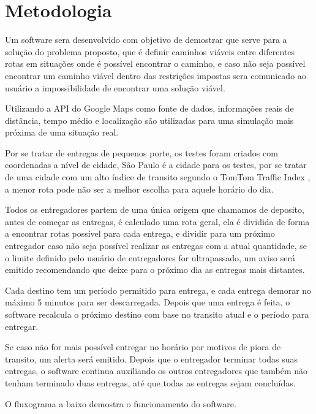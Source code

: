 \chapter{Metodologia}
Um software sera desenvolvido com objetivo de demostrar que serve para a solução do problema proposto, que é definir caminhos viáveis entre diferentes rotas em situações onde é possível encontrar o caminho, e caso não seja possível encontrar um caminho viável dentro das restrições impostas sera comunicado ao usuário a impossibilidade de encontrar uma solução viável.

Utilizando a API do Google Maps como fonte de dados, informações reais de distância, tempo médio e localização são utilizadas para uma simulação mais próxima de uma situação real.

Por se tratar de entregas de pequenos porte, os testes foram criados com coordenadas a nível de cidade, São Paulo é a cidade para os testes, por se tratar de uma cidade com um alto índice de transito segundo o TomTom Traffic Index \cite{TomTom}, a menor rota pode não ser a melhor escolha para aquele horário do dia.

Todos os entregadores partem de uma única origem que chamamos de deposito, antes de começar as entregas, é calculado uma rota geral, ela é dividida de forma a encontrar rotas possível para cada entrega, e dividir para um próximo entregador caso não seja possível realizar as entregas com a atual quantidade, se o limite definido pelo usuário de entregadores for ultrapassado, um aviso será emitido recomendando que deixe para o próximo dia as entregas mais distantes.

Cada destino tem um período permitido para entrega, e cada entrega demorar no máximo 5 minutos para ser descarregada. Depois que uma entrega é feita, o software recalcula o próximo destino com base no transito atual e o período para entregar.

Se caso não for mais possível entregar no horário por motivos de piora de transito, um alerta será emitido. Depois que o entregador terminar todas suas entregas, o software continua auxiliando os outros entregadores que também não tenham terminado duas entregas, até que todas as entregas sejam concluídas.

O fluxograma a baixo demostra o funcionamento do software.

\begin{minipage}{\linewidth}
    \label{fig:FluxoSoftare}
\end{minipage}

